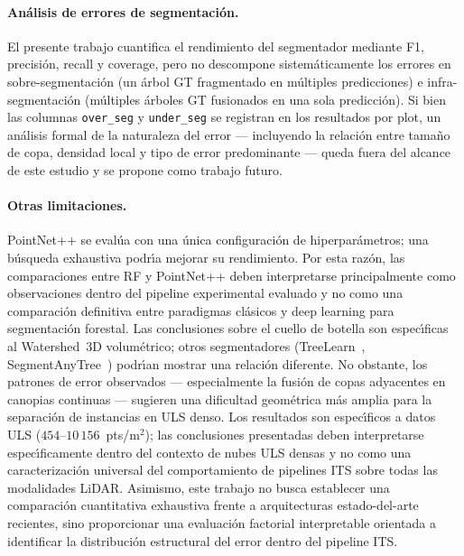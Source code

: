 \documentclass{cys}
\begin{document}
\paragraph{An\'alisis de errores de segmentaci\'on.}
El presente trabajo cuantifica el rendimiento del segmentador mediante F1, precisi\'on, recall y coverage, pero no descompone sistem\'aticamente los errores en sobre-segmentaci\'on (un \'arbol GT fragmentado en m\'ultiples predicciones) e infra-segmentaci\'on (m\'ultiples \'arboles GT fusionados en una sola predicci\'on). Si bien las columnas \texttt{over\_seg} y \texttt{under\_seg} se registran en los resultados por plot, un an\'alisis formal de la naturaleza del error --- incluyendo la relaci\'on entre tama\~no de copa, densidad local y tipo de error predominante --- queda fuera del alcance de este estudio y se propone como trabajo futuro.

\paragraph{Otras limitaciones.}
PointNet++ se eval\'ua con una \'unica configuraci\'on de hiperpar\'ametros; una b\'usqueda exhaustiva podr\'\i{}a mejorar su rendimiento. Por esta raz\'on, las comparaciones entre RF y PointNet++ deben interpretarse principalmente como observaciones dentro del pipeline experimental evaluado y no como una comparaci\'on definitiva entre paradigmas cl\'asicos y deep learning para segmentaci\'on forestal. Las conclusiones sobre el cuello de botella son espec\'\i{}ficas al Watershed~3D volum\'etrico; otros segmentadores (TreeLearn~\cite{henrich2024}, SegmentAnyTree~\cite{wielgosz2024}) podr\'\i{}an mostrar una relaci\'on diferente. No obstante, los patrones de error observados --- especialmente la fusi\'on de copas adyacentes en canopias continuas --- sugieren una dificultad geom\'etrica m\'as amplia para la separaci\'on de instancias en ULS denso. Los resultados son espec\'\i{}ficos a datos ULS ($454$--$10\,156$~pts/m$^2$); las conclusiones presentadas deben interpretarse espec\'\i{}ficamente dentro del contexto de nubes ULS densas y no como una caracterizaci\'on universal del comportamiento de pipelines ITS sobre todas las modalidades LiDAR. Asimismo, este trabajo no busca establecer una comparaci\'on cuantitativa exhaustiva frente a arquitecturas estado-del-arte recientes, sino proporcionar una evaluaci\'on factorial interpretable orientada a identificar la distribuci\'on estructural del error dentro del pipeline ITS.

\end{document}
